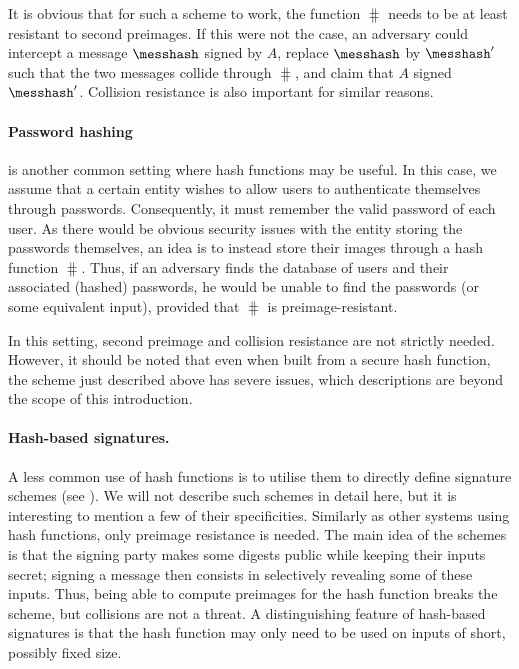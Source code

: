 It is obvious that for such a scheme to work, the function $\hash$ needs to be at least resistant to second preimages. If this were not the case, an adversary could intercept a message $\messhash$
signed by $A$, replace $\messhash$ by $\messhash'$ such that the two messages collide through $\hash$, and claim that $A$ signed $\messhash'$.
Collision resistance is also important for similar reasons.

\paragraph{Password hashing} is another common setting where hash functions may be useful. In this case, we assume that a certain entity wishes to allow users to authenticate themselves
through passwords. Consequently, it must remember the valid password of each user. As there would be obvious security issues with the entity storing the passwords themselves, an idea
is to instead store their images through a hash function $\hash$. Thus, if an adversary finds the database of users and their associated (hashed) passwords, he would be unable to find
the passwords (or some equivalent input), provided that $\hash$ is preimage-resistant.

In this setting, second preimage and collision resistance are not strictly needed. However, it should be noted that even when built from a secure hash function,
the scheme just described above has severe issues, which descriptions are beyond the scope of this introduction.

\paragraph{Hash-based signatures.} A less common use of hash functions is to utilise them to directly define signature schemes (see \eg \cite{DBLP:conf/crypto/Merkle87}). We will not describe such schemes in detail
here, but it is interesting to mention a few of their specificities. Similarly as other systems using hash functions, only preimage resistance is needed. The main
idea of the schemes is that the signing party makes some digests public while keeping their inputs secret; signing a message then consists in selectively revealing some of
these inputs. Thus, being able to compute preimages for the hash function breaks the scheme, but collisions are not a threat.
A distinguishing feature of hash-based signatures is that the hash function may only need to be used on inputs of short, possibly fixed size. 

